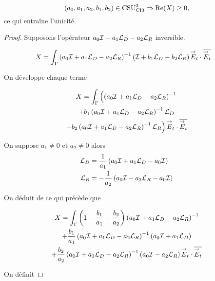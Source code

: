   
  \begin{prop}
    \label{prop:csu:ci3-3}
    \begin{equation*}
      (a_0,a_1,a_2,b_1,b_2) \in \CSU[3]{CI3} \Rightarrow \Re(X) \ge 0,
    \end{equation*}
    ce qui entraîne l'unicité.
  \end{prop}

  \begin{proof}
    Supposons l'opérateur \(a_0\oI + a_1 \LD - a_2 \LR\) inversible.

    \begin{align*}
      X &= \int_\Gamma \left(a_0\oI + a_1 \LD - a_2 \LR \right)^{-1}\left( \oI + b_1 \LD - b_2 \LR \right) \vE_t\cdot \conj{\vE_t}
    \end{align*}

    On développe chaque terme

    \begin{multline*}
      X = \int_\Gamma \left(\left(a_0\oI + a_1 \LD - a_2 \LR \right)^{-1}
      \right.
      \\
      + b_1 \left(a_0\oI + a_1 \LD - a_2 \LR \right)^{-1}\LD
      \\
      \left.
      - b_2 \left(a_0\oI + a_1 \LD - a_2 \LR \right)^{-1}\LR \right) \vE_t\cdot \conj{\vE_t}
    \end{multline*}

    On suppose \(a_1\not=0\) et \(a_2\not=0\) alors
    \begin{align*}
      \LD & = \frac{1}{a_1}\left(a_0\oI + a_1 \LD - a_0\oI\right)
      \\
      \LR & = -\frac{1}{a_2}\left(a_0\oI - a_2 \LR - a_0\oI\right)
    \end{align*}


    On déduit de ce qui précède que

    \begin{multline*}
      X = \int_\Gamma \left(1-\frac{b_1}{a_1} -\frac{b_2}{a_2}\right)\left(a_0\oI + a_1 \LD - a_2 \LR \right)^{-1}
      \\
      + \frac{b_1}{a_1} \left(a_0\oI + a_1 \LD - a_2 \LR \right)^{-1}\left(a_0\oI + a_1\LD\right)
      \\
      + \frac{b_2}{a_2} \left(a_0\oI + a_1 \LD - a_2 \LR \right)^{-1}\left(a_0\oI - a_2\LR\right) \vE_t\cdot \conj{\vE_t}
    \end{multline*}

    On définit

    \newcommand{\vV}{\vect{V}}
    \newcommand{\vW}{\vect{W}}


\end{proof}
